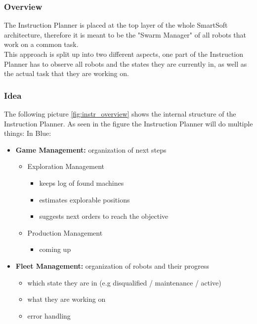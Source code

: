

\subsubsection{Overview}
The Instruction Planner is placed at the top layer of the whole SmartSoft architecture,
therefore it is meant to be the "Swarm Manager" of all robots that work on a common task. \\
This approach is split up into two different aspects, one part of the Instruction Planner has to
observe all robots and the states they are currently in, as well as the actual task that they are working on.

\subsubsection{Idea}

The following picture \ref{fig:instr_overview} shows the internal structure of the
Instruction Planner.
As seen in the figure the Instruction Planner will do multiple things: \newpage
In Blue:\\
\begin{itemize}
    \item \textbf{Game Management:}  organization of next steps
    \begin{itemize}
        \item Exploration Management
            \begin{itemize}
                \item keeps log of found machines
                \item estimates explorable positions
                \item suggests next orders to reach the objective
            \end{itemize}
        \item Production Management
        \begin{itemize}
            \item coming up
        \end{itemize}
    \end{itemize}
    \item \textbf{Fleet Management:} organization of robots and their progress
    \begin{itemize}
        \item which state they are in (e.g disqualified / maintenance / active)
        \item what they are working on
        \item error handling
    \end{itemize}
\end{itemize}

